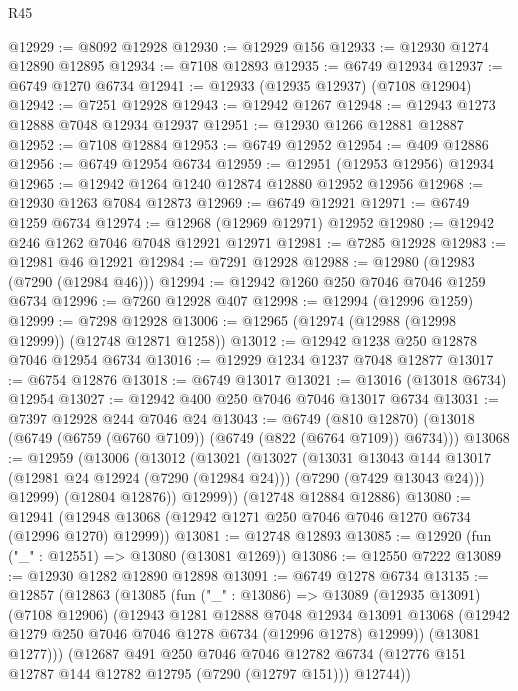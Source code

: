 \begin{lexlean}{R45}
\begin{coremodule}
{@12929 := @8092 @12928
@12930 := @12929 @156
@12933 := @12930 @1274 @12890 @12895
@12934 := @7108 @12893
@12935 := @6749 @12934
@12937 := @6749 @1270 @6734
@12941 := @12933 (@12935 @12937) (@7108 @12904)
@12942 := @7251 @12928
@12943 := @12942 @1267
@12948 := @12943 @1273 @12888 @7048 @12934 @12937
@12951 := @12930 @1266 @12881 @12887
@12952 := @7108 @12884
@12953 := @6749 @12952
@12954 := @409 @12886
@12956 := @6749 @12954 @6734
@12959 := @12951 (@12953 @12956) @12934
@12965 := @12942 @1264 @1240 @12874 @12880 @12952 @12956
@12968 := @12930 @1263 @7084 @12873
@12969 := @6749 @12921
@12971 := @6749 @1259 @6734
@12974 := @12968 (@12969 @12971) @12952
@12980 := @12942 @246 @1262 @7046 @7048 @12921 @12971
@12981 := @7285 @12928
@12983 := @12981 @46 @12921
@12984 := @7291 @12928
@12988 := @12980 (@12983 (@7290 (@12984 @46)))
@12994 := @12942 @1260 @250 @7046 @7046 @1259 @6734
@12996 := @7260 @12928 @407
@12998 := @12994 (@12996 @1259)
@12999 := @7298 @12928
@13006 := @12965 (@12974 (@12988 (@12998 @12999)) (@12748 @12871 @1258))
@13012 := @12942 @1238 @250 @12878 @7046 @12954 @6734
@13016 := @12929 @1234 @1237 @7048 @12877
@13017 := @6754 @12876
@13018 := @6749 @13017
@13021 := @13016 (@13018 @6734) @12954
@13027 := @12942 @400 @250 @7046 @7046 @13017 @6734
@13031 := @7397 @12928 @244 @7046 @24
@13043 := @6749
    (@810 @12870)
    (@13018 (@6749 (@6759 (@6760 @7109)) (@6749 (@822 (@6764 @7109)) @6734)))
@13068 := @12959
    (@13006
      (@13012
        (@13021
          (@13027
            (@13031
              @13043
              @144
              @13017
              (@12981 @24 @12924 (@7290 (@12984 @24)))
              (@7290 (@7429 @13043 @24)))
            @12999)
          (@12804 @12876))
        @12999))
    (@12748 @12884 @12886)
@13080 := @12941 (@12948 @13068 (@12942 @1271 @250 @7046 @7046 @1270 @6734 (@12996 @1270) @12999))
@13081 := @12748 @12893
@13085 := @12920 (fun ("_" : @12551) => @13080 (@13081 @1269))
@13086 := @12550 @7222
@13089 := @12930 @1282 @12890 @12898
@13091 := @6749 @1278 @6734
@13135 := @12857
    (@12863
      (@13085
        (fun ("_" : @13086) =>
        @13089
          (@12935 @13091)
          (@7108 @12906)
          (@12943
            @1281
            @12888
            @7048
            @12934
            @13091
            @13068
            (@12942 @1279 @250 @7046 @7046 @1278 @6734 (@12996 @1278) @12999))
          (@13081 @1277)))
      (@12687
        @491
        @250
        @7046
        @7046
        @12782
        @6734
        (@12776 @151 @12787 @144 @12782 @12795 (@7290 (@12797 @151)))
        @12744))
}
\end{coremodule}
\end{lexlean}

